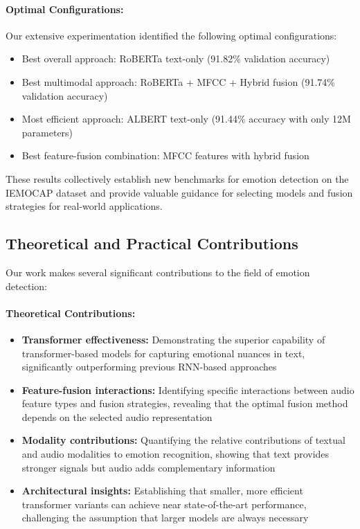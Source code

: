\documentclass[12pt]{article}
\begin{document}
\paragraph{Optimal Configurations:}
Our extensive experimentation identified the following optimal configurations:
\begin{itemize}
    \item Best overall approach: RoBERTa text-only (91.82\% validation accuracy)
    
    \item Best multimodal approach: RoBERTa + MFCC + Hybrid fusion (91.74\% validation accuracy)
    
    \item Most efficient approach: ALBERT text-only (91.44\% accuracy with only 12M parameters)
    
    \item Best feature-fusion combination: MFCC features with hybrid fusion
\end{itemize}

These results collectively establish new benchmarks for emotion detection on the IEMOCAP dataset and provide valuable guidance for selecting models and fusion strategies for real-world applications.

\subsection{Theoretical and Practical Contributions}
Our work makes several significant contributions to the field of emotion detection:

\paragraph{Theoretical Contributions:}
\begin{itemize}
    \item \textbf{Transformer effectiveness:} Demonstrating the superior capability of transformer-based models for capturing emotional nuances in text, significantly outperforming previous RNN-based approaches
    
    \item \textbf{Feature-fusion interactions:} Identifying specific interactions between audio feature types and fusion strategies, revealing that the optimal fusion method depends on the selected audio representation
    
    \item \textbf{Modality contributions:} Quantifying the relative contributions of textual and audio modalities to emotion recognition, showing that text provides stronger signals but audio adds complementary information
    
    \item \textbf{Architectural insights:} Establishing that smaller, more efficient transformer variants can achieve near state-of-the-art performance, challenging the assumption that larger models are always necessary
\end{itemize}
\end{document}
